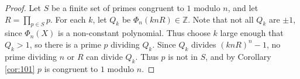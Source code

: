 \documentclass{article}
\newcommand{\Z}{\mathbb{Z}}
\newcommand{\rb}[1]{\left( #1 \right)}
\theoremstyle{definition}\newtheorem{definition}{Definition}
\theoremstyle{definition}\newtheorem{remark}[definition]{Remark}
\theoremstyle{definition}\newtheorem*{example}{Example}
\theoremstyle{definition}\newtheorem*{note}{Note}
\begin{document}
\begin{proof}
Let $ S $ be a finite set of primes congruent to $ 1 $ modulo $ n $, and let $ R = \prod_{p \in S} p $. For each $ k $, let $ Q_k $ be $ \Phi_n\rb{knR} \in \Z $. Note that not all $ Q_k $ are $ \pm 1 $, since $ \Phi_n\rb{X} $ is a non-constant polynomial. Thus choose $ k $ large enough that $ Q_k > 1 $, so there is a prime $ p $ dividing $ Q_k $. Since $ Q_k $ divides $ \rb{knR}^n - 1 $, no prime dividing $ n $ or $ R $ can divide $ Q_k $. Thus $ p $ is not in $ S $, and by Corollary \ref{cor:101} $ p $ is congruent to $ 1 $ modulo $ n $.
\end{proof}
\end{document}
